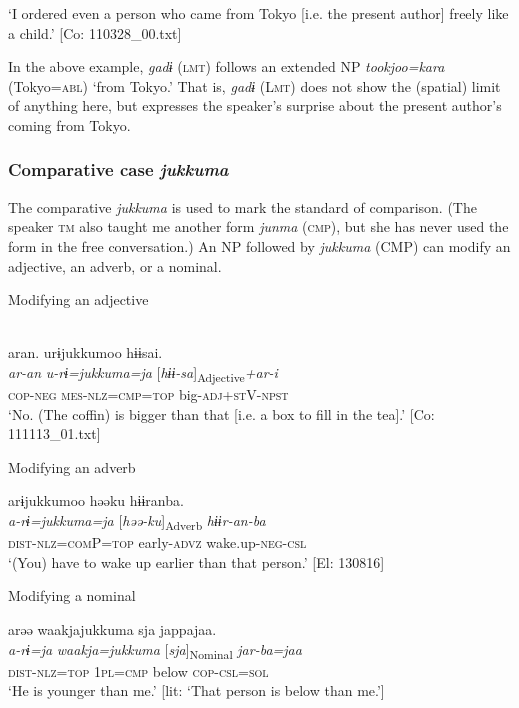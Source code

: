 \begin{table}
\glt    ‘I ordered even a person who came from Tokyo [i.e. the present author] freely like a child.’ [Co: 110328\_00.txt]
\z

In the above example, \textit{gadɨ} (\textsc{lmt}) follows an extended NP \textit{tookjoo=kara} (Tokyo=\textsc{abl}) ‘from Tokyo.’ That is, \textit{gadɨ} (L\textsc{mt}) does not show the (spatial) limit of anything here, but expresses the speaker’s surprise about the present author’s coming from Tokyo.

\subsubsection{Comparative case \textit{jukkuma}}

The comparative \textit{jukkuma} is used to mark the standard of comparison. (The speaker \textsc{tm} also taught me another form \textit{junma} (\textsc{cmp}), but she has never used the form in the free conversation.) An NP followed by \textit{jukkuma} (CMP) can modify an adjective, an adverb, or a nominal.

\ea\label{ex:6-78}
  Modifying an adjective

 \ea{}\\
{\TM}
\glll  aran.  urɨjukkumoo  hɨɨsai.\\
\textit{ar-an}  \textit{u-rɨ=jukkuma=ja}  [\textit{hɨɨ-sa}]\textsubscript{Adjective}\textit{+ar-i}\\
\textsc{cop}-\textsc{neg}  \textsc{mes}-\textsc{nlz}=\textsc{cmp}=\textsc{top}  big-\textsc{adj}+\textsc{st}V-\textsc{npst}\\
\glt ‘No. (The coffin) is bigger than that [i.e. a box to fill in the tea].’ [Co: 111113\_01.txt]
\z

  Modifying an adverb

\ex {\TM}  arɨjukkumoo  həəku  hɨɨranba.\\
\glll \textit{a-rɨ=jukkuma=ja}  [\textit{həə-ku}]\textsubscript{Adverb}  \textit{hɨɨr-an-ba}\\
\textsc{dist}-\textsc{nlz}=\textsc{com}P=\textsc{top}  early-\textsc{advz}  wake.up-\textsc{neg}-\textsc{csl}\\
\glt ‘(You) have to wake up earlier than that person.’ [El: 130816]

  Modifying a nominal

\ex {\TM}  arəə  waakjajukkuma  sja  jappajaa.\\
\glll \textit{a-rɨ=ja}  \textit{waakja=jukkuma}  [\textit{sja}]\textsubscript{Nominal}  \textit{jar-ba=jaa}\\
\textsc{dist}-\textsc{nlz}=\textsc{top}  1\textsc{pl}=\textsc{cmp}  below  \textsc{cop}-\textsc{csl}=\textsc{sol}\\
\glt ‘He is younger than me.’ [lit: ‘That person is below than me.’]


\end{table}
